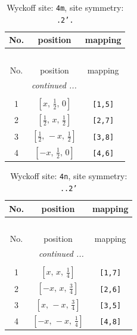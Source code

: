 \documentclass[fleqn,8pt]{jsarticle}
\begin{document}
\renewcommand{\arraystretch}{1.2}
\begin{longtable}{ccc}
\caption{Wyckoff site: {\tt 4m}, site symmetry: {\tt .2'.}}
 \\
 \hline \hline
No. & position & mapping \\ \hline \endfirsthead

\multicolumn{2}{l}{\tablename\ \thetable{}} \\
 \hline \hline
No. & position & mapping \\ \hline \endhead

 \hline \hline
\multicolumn{2}{r}{\footnotesize\it continued ...} \\ \endfoot

 \hline \hline
\multicolumn{2}{r}{} \\ \endlastfoot

1 & $\left[ x,\, \frac{1}{2},\, 0 \right]$ & {\tt [1,5]} \\ \hline
2 & $\left[ \frac{1}{2},\, x,\, \frac{1}{2} \right]$ & {\tt [2,7]} \\ \hline
3 & $\left[ \frac{1}{2},\, - x,\, \frac{1}{2} \right]$ & {\tt [3,8]} \\ \hline
4 & $\left[ - x,\, \frac{1}{2},\, 0 \right]$ & {\tt [4,6]} \\
\end{longtable}
\renewcommand{\arraystretch}{1.2}
\begin{longtable}{ccc}
\caption{Wyckoff site: {\tt 4n}, site symmetry: {\tt ..2'}}
 \\
 \hline \hline
No. & position & mapping \\ \hline \endfirsthead

\multicolumn{2}{l}{\tablename\ \thetable{}} \\
 \hline \hline
No. & position & mapping \\ \hline \endhead

 \hline \hline
\multicolumn{2}{r}{\footnotesize\it continued ...} \\ \endfoot

 \hline \hline
\multicolumn{2}{r}{} \\ \endlastfoot

1 & $\left[ x,\, x,\, \frac{1}{4} \right]$ & {\tt [1,7]} \\ \hline
2 & $\left[ - x,\, x,\, \frac{3}{4} \right]$ & {\tt [2,6]} \\ \hline
3 & $\left[ x,\, - x,\, \frac{3}{4} \right]$ & {\tt [3,5]} \\ \hline
4 & $\left[ - x,\, - x,\, \frac{1}{4} \right]$ & {\tt [4,8]} \\
\end{longtable}
\end{document}

